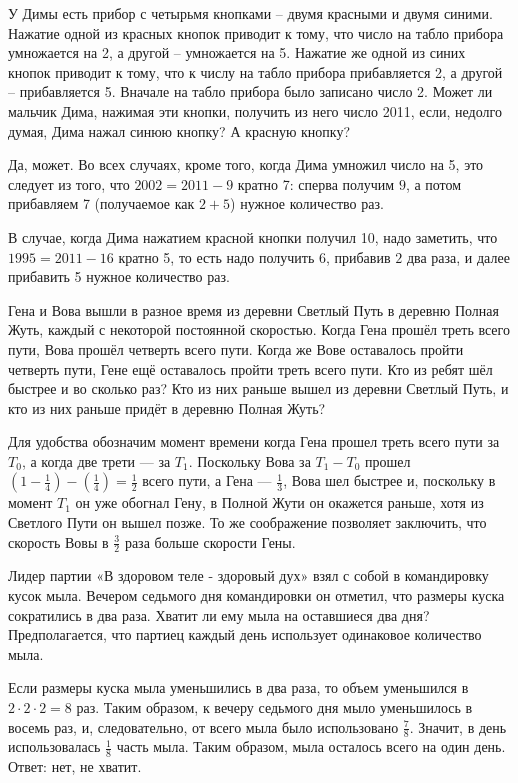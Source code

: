
\begin{itemize}
\itC У Димы есть прибор с четырьмя кнопками – двумя красными и двумя синими. Нажатие 
одной из красных кнопок приводит к тому, что число на табло прибора умножается на 2, 
а другой – умножается на 5. Нажатие же одной из синих кнопок приводит к тому, что к числу 
на табло прибора прибавляется 2, а другой – прибавляется 5. Вначале на табло прибора 
было записано число 2. Может ли мальчик Дима, нажимая эти кнопки, получить из него число 
2011, если, недолго думая, Дима нажал синюю кнопку? А красную кнопку?

\itr Да, может. Во всех случаях, кроме того, когда Дима умножил число на 5, это 
следует из того, что $2002 = 2011-9$ кратно 7: сперва получим $9$, а потом прибавляем
7 (получаемое как $2+5$) нужное количество раз.

В случае, когда Дима нажатием красной кнопки получил 10, надо заметить, что $1995 = 2011-16$ 
кратно 5, то есть надо получить $6$, прибавив $2$ два раза, и далее прибавить 5 нужное 
количество раз.
\end{itemize}

\begin{itemize}
\itC Гена и Вова вышли в разное время из деревни Светлый Путь в деревню Полная Жуть, каждый с некоторой 
постоянной скоростью. Когда Гена прошёл треть всего пути, Вова прошёл четверть всего 
пути. Когда же Вове оставалось пройти четверть пути, Гене ещё оставалось пройти треть 
всего пути. Кто из ребят шёл быстрее и во сколько раз? Кто из них раньше вышел из деревни
Светлый Путь, и кто из них раньше придёт в деревню Полная Жуть?

\itr Для удобства обозначим момент времени когда Гена прошел треть всего пути за $T_0$, 
а когда две трети --- за $T_1$. Поскольку Вова за $T_1-T_0$ прошел 
$(1-\frac{1}{4})-(\frac{1}{4}) = \frac{1}{2}$ всего пути, 
а Гена --- $\frac{1}{3}$, Вова шел быстрее и, поскольку в момент $T_1$ он уже обогнал Гену,
в Полной Жути он окажется раньше, хотя из Светлого Пути он вышел позже. 
То же соображение позволяет заключить, что скорость Вовы в $\frac{3}{2}$ раза больше
скорости Гены.
\end{itemize}

\begin{itemize}
\itC Лидер партии «В здоровом теле - здоровый дух» взял с собой в командировку 
кусок мыла. Вечером седьмого дня командировки он отметил, что размеры куска 
сократились в два раза. Хватит ли ему мыла на оставшиеся два дня? Предполагается, 
что партиец каждый день использует одинаковое количество мыла.

\itr Если размеры куска мыла уменьшились в два раза, то объем уменьшился в 
$2\cdot 2\cdot 2=8$ раз. Таким образом, к вечеру седьмого дня мыло уменьшилось 
в восемь раз, и, следовательно, от всего мыла было использовано $\frac{7}{8}$. 
Значит, в день использовалась $\frac{1}{8}$ часть мыла. Таким образом, мыла 
осталось всего на один день. Ответ: нет, не хватит.

\end{itemize}

